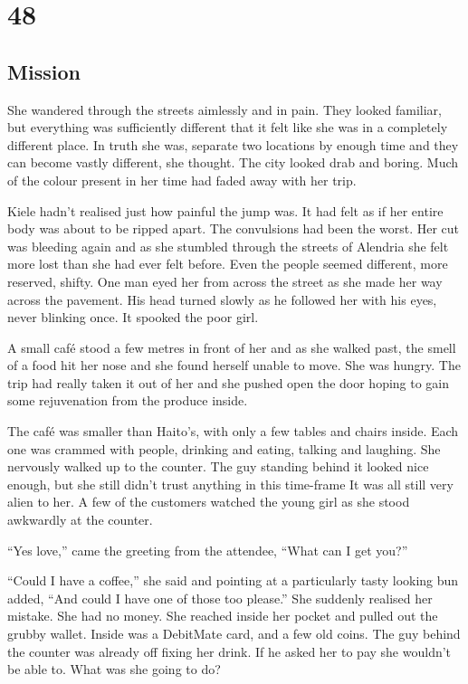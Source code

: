 \chapter{48}
\section{Mission}


She wandered through the streets aimlessly and in pain.  They looked familiar, but everything was sufficiently different that it felt like she was in a completely different place.  In truth she was, separate two locations by enough time and they can become vastly different, she thought.  The city looked drab and boring.  Much of the colour present in her time had faded away with her trip.  

Kiele hadn't realised just how painful the jump was.  It had felt as if her entire body was about to be ripped apart.  The convulsions had been the worst.  Her cut was bleeding again and as she stumbled through the streets of Alendria she felt more lost than she had ever felt before.  Even the people seemed different, more reserved, shifty.  One man eyed her from across the street as she made her way across the pavement.  His head turned slowly as he followed her with his eyes, never blinking once.  It spooked the poor girl.

A small café stood a few metres in front of her and as she walked past, the smell of a food hit her nose and she found herself unable to move.  She was hungry.  The trip had really taken it out of her and she pushed open the door hoping to gain some rejuvenation from the produce inside.

The café was smaller than Haito's, with only a few tables and chairs inside.  Each one was crammed with people, drinking and eating, talking and laughing.  She nervously walked up to the counter.  The guy standing behind it looked nice enough, but she still didn't trust anything in this time-frame  It was all still very alien to her.  A few of the customers watched the young girl as she stood awkwardly at the counter.  

``Yes love,'' came the greeting from the attendee, ``What can I get you?''

``Could I have a coffee,'' she said and pointing at a particularly tasty looking bun added, ``And could I have one of those too please.''  She suddenly realised her mistake.  She had no money.  She reached inside her pocket and pulled out the grubby wallet.  Inside was a DebitMate card, and a few old coins.  The guy behind the counter was already off fixing her drink.  If he asked her to pay she wouldn't be able to.  What was she going to do?

